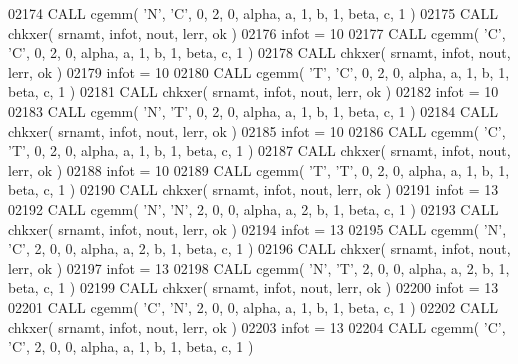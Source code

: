 \begin{DoxyCode}
02174       \textcolor{keyword}{CALL }cgemm( \textcolor{stringliteral}{'N'}, \textcolor{stringliteral}{'C'}, 0, 2, 0, alpha, a, 1, b, 1, beta, c, 1 )
02175       \textcolor{keyword}{CALL }chkxer( srnamt, infot, nout, lerr, ok )
02176       infot = 10
02177       \textcolor{keyword}{CALL }cgemm( \textcolor{stringliteral}{'C'}, \textcolor{stringliteral}{'C'}, 0, 2, 0, alpha, a, 1, b, 1, beta, c, 1 )
02178       \textcolor{keyword}{CALL }chkxer( srnamt, infot, nout, lerr, ok )
02179       infot = 10
02180       \textcolor{keyword}{CALL }cgemm( \textcolor{stringliteral}{'T'}, \textcolor{stringliteral}{'C'}, 0, 2, 0, alpha, a, 1, b, 1, beta, c, 1 )
02181       \textcolor{keyword}{CALL }chkxer( srnamt, infot, nout, lerr, ok )
02182       infot = 10
02183       \textcolor{keyword}{CALL }cgemm( \textcolor{stringliteral}{'N'}, \textcolor{stringliteral}{'T'}, 0, 2, 0, alpha, a, 1, b, 1, beta, c, 1 )
02184       \textcolor{keyword}{CALL }chkxer( srnamt, infot, nout, lerr, ok )
02185       infot = 10
02186       \textcolor{keyword}{CALL }cgemm( \textcolor{stringliteral}{'C'}, \textcolor{stringliteral}{'T'}, 0, 2, 0, alpha, a, 1, b, 1, beta, c, 1 )
02187       \textcolor{keyword}{CALL }chkxer( srnamt, infot, nout, lerr, ok )
02188       infot = 10
02189       \textcolor{keyword}{CALL }cgemm( \textcolor{stringliteral}{'T'}, \textcolor{stringliteral}{'T'}, 0, 2, 0, alpha, a, 1, b, 1, beta, c, 1 )
02190       \textcolor{keyword}{CALL }chkxer( srnamt, infot, nout, lerr, ok )
02191       infot = 13
02192       \textcolor{keyword}{CALL }cgemm( \textcolor{stringliteral}{'N'}, \textcolor{stringliteral}{'N'}, 2, 0, 0, alpha, a, 2, b, 1, beta, c, 1 )
02193       \textcolor{keyword}{CALL }chkxer( srnamt, infot, nout, lerr, ok )
02194       infot = 13
02195       \textcolor{keyword}{CALL }cgemm( \textcolor{stringliteral}{'N'}, \textcolor{stringliteral}{'C'}, 2, 0, 0, alpha, a, 2, b, 1, beta, c, 1 )
02196       \textcolor{keyword}{CALL }chkxer( srnamt, infot, nout, lerr, ok )
02197       infot = 13
02198       \textcolor{keyword}{CALL }cgemm( \textcolor{stringliteral}{'N'}, \textcolor{stringliteral}{'T'}, 2, 0, 0, alpha, a, 2, b, 1, beta, c, 1 )
02199       \textcolor{keyword}{CALL }chkxer( srnamt, infot, nout, lerr, ok )
02200       infot = 13
02201       \textcolor{keyword}{CALL }cgemm( \textcolor{stringliteral}{'C'}, \textcolor{stringliteral}{'N'}, 2, 0, 0, alpha, a, 1, b, 1, beta, c, 1 )
02202       \textcolor{keyword}{CALL }chkxer( srnamt, infot, nout, lerr, ok )
02203       infot = 13
02204       \textcolor{keyword}{CALL }cgemm( \textcolor{stringliteral}{'C'}, \textcolor{stringliteral}{'C'}, 2, 0, 0, alpha, a, 1, b, 1, beta, c, 1 )

\end{DoxyCode}
